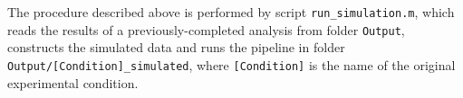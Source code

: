 \documentclass[final,letterpaper,twoside,12pt]{article}
\begin{document}
\par The procedure described above is performed by script \texttt{run\_simulation.m}, which reads the results of a previously-completed analysis from folder \texttt{Output}, constructs the simulated data and runs the pipeline in folder \texttt{Output/[Condition]\_simulated}, where \texttt{[Condition]} is the name of the original experimental condition.






\end{document}
